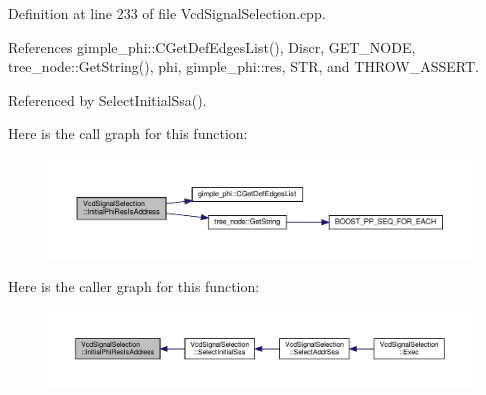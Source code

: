 Definition at line 233 of file Vcd\+Signal\+Selection.\+cpp.



References gimple\+\_\+phi\+::\+C\+Get\+Def\+Edges\+List(), Discr, G\+E\+T\+\_\+\+N\+O\+DE, tree\+\_\+node\+::\+Get\+String(), phi, gimple\+\_\+phi\+::res, S\+TR, and T\+H\+R\+O\+W\+\_\+\+A\+S\+S\+E\+RT.



Referenced by Select\+Initial\+Ssa().

Here is the call graph for this function\+:
\nopagebreak
\begin{figure}[H]
\begin{center}
\leavevmode
\includegraphics[width=350pt]{dd/de4/classVcdSignalSelection_a723d96ff2ac6cdb37af8117f70b75514_cgraph}
\end{center}
\end{figure}
Here is the caller graph for this function\+:
\nopagebreak
\begin{figure}[H]
\begin{center}
\leavevmode
\includegraphics[width=350pt]{dd/de4/classVcdSignalSelection_a723d96ff2ac6cdb37af8117f70b75514_icgraph}
\end{center}
\end{figure}
\mbox{\label{classVcdSignalSelection_a74df1de6a56940a7fa4e712fc22d9e02}} 
